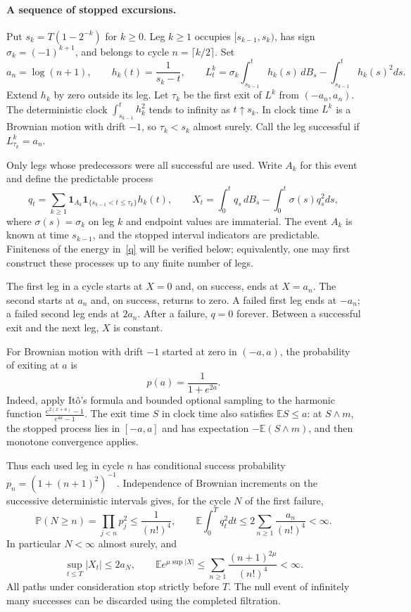 \documentclass[11pt]{article}
\newcommand{\E}{\mathbb E}
\newcommand{\Pp}{\mathbb P}
\begin{document}
\paragraph{A sequence of stopped excursions.}
Put $s_k=T(1-2^{-k})$ for $k\geq0$. Leg $k\geq1$ occupies $[s_{k-1},s_k)$, has sign $\sigma_k=(-1)^{k+1}$, and belongs to cycle $n=\lceil k/2\rceil$. Set
\[
 a_n=\log(n+1),\qquad h_k(t)=\frac1{s_k-t},\qquad
 L^k_t=\sigma_k\int_{s_{k-1}}^t h_k(s)\,dB_s
            -\int_{s_{k-1}}^t h_k(s)^2ds.
\]
Extend $h_k$ by zero outside its leg. Let $\tau_k$ be the first exit of $L^k$ from $(-a_n,a_n)$. The deterministic clock $\int_{s_{k-1}}^t h_k^2$ tends to infinity as $t\uparrow s_k$. In clock time $L^k$ is a Brownian motion with drift $-1$, so $\tau_k<s_k$ almost surely. Call the leg successful if $L^k_{\tau_k}=a_n$.

Only legs whose predecessors were all successful are used. Write $A_k$ for this event and define the predictable process
\begin{equation}\label{q}
 q_t=\sum_{k\geq1}\mathbf1_{A_k}\mathbf1_{\{s_{k-1}<t\leq\tau_k\}}h_k(t),
 \qquad
 X_t=\int_0^t q_s\,dB_s-\int_0^t\sigma(s)q_s^2ds,
\end{equation}
where $\sigma(s)=\sigma_k$ on leg $k$ and endpoint values are immaterial. The event $A_k$ is known at time $s_{k-1}$, and the stopped interval indicators are predictable. Finiteness of the energy in~\eqref{q} will be verified below; equivalently, one may first construct these processes up to any finite number of legs.

The first leg in a cycle starts at $X=0$ and, on success, ends at $X=a_n$. The second starts at $a_n$ and, on success, returns to zero. A failed first leg ends at $-a_n$; a failed second leg ends at $2a_n$. After a failure, $q=0$ forever. Between a successful exit and the next leg, $X$ is constant.

For Brownian motion with drift $-1$ started at zero in $(-a,a)$, the probability of exiting at $a$ is
\[
 p(a)=\frac1{1+e^{2a}}.
\]
Indeed, apply It\^o's formula and bounded optional sampling to the harmonic function
$\frac{e^{2(x+a)}-1}{e^{4a}-1}$. The exit time $S$ in clock time also satisfies $\E S\leq a$: at $S\wedge m$, the stopped process lies in $[-a,a]$ and has expectation $-\E(S\wedge m)$, and then monotone convergence applies.

Thus each used leg in cycle $n$ has conditional success probability
$p_n=(1+(n+1)^2)^{-1}$. Independence of Brownian increments on the successive deterministic intervals gives, for the cycle $N$ of the first failure,
\begin{equation}\label{tails}
 \Pp(N\geq n)=\prod_{j<n}p_j^2\leq\frac1{(n!)^4},\qquad
 \E\int_0^Tq_t^2dt\leq2\sum_{n\geq1}\frac{a_n}{(n!)^4}<\infty.
\end{equation}
In particular $N<\infty$ almost surely, and
\begin{equation}\label{maximum}
 \sup_{t\leq T}|X_t|\leq2a_N,\qquad
 \E e^{\mu\sup|X|}\leq\sum_{n\geq1}\frac{(n+1)^{2\mu}}{(n!)^4}<\infty.
\end{equation}
All paths under consideration stop strictly before $T$. The null event of infinitely many successes can be discarded using the completed filtration.
\end{document}
